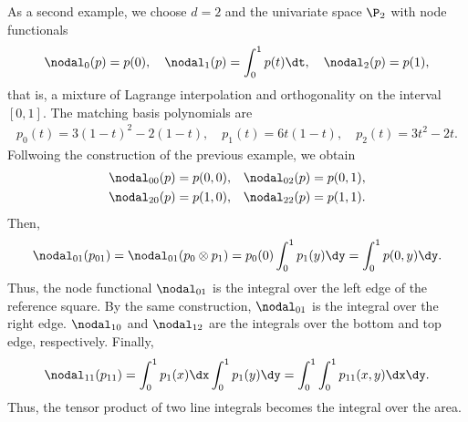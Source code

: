 

\begin{example}
  As a second example, we choose $d=2$ and the univariate space $\P_2$ with node functionals
  \begin{gather}
    \nodal_0(p) = p(0),
    \quad \nodal_1(p) = \int_0^1 p(t) \dt,
    \quad \nodal_2(p) = p(1),
  \end{gather}
  that is, a mixture of Lagrange interpolation and orthogonality on
  the interval $[0,1]$. The matching basis polynomials are
  \begin{gather}
    p_0(t) = 3(1-t)^2 - 2(1-t),
    \quad p_1(t) = 6 t(1-t),
    \quad p_2(t) = 3t^2-2t.
  \end{gather}
  Follwoing the construction of the previous example, we obtain
  \begin{gather}
    \begin{aligned}
    \nodal_{00}(p) &= p(0,0),
    &\nodal_{02}(p) &= p(0,1),\\
    \nodal_{20}(p) &= p(1,0),
    &\nodal_{22}(p) &= p(1,1).
    \end{aligned}
  \end{gather}
  Then,
  \begin{gather}
    \nodal_{01}(p_{01}) = \nodal_{01}(p_0\otimes p_1)
    = p_0(0)\int_0^1 p_1(y)\dy
    = \int_0^1 p(0,y) \dy.
  \end{gather}
  Thus, the node functional $\nodal_{01}$ is the integral over the
  left edge of the reference square. By the same construction,
  $\nodal_{01}$ is the integral over the right edge. $\nodal_{10}$ and
  $\nodal_{12}$ are the integrals over the bottom and top edge,
  respectively. Finally,
  \begin{gather}
    \nodal_{11}(p_{11})
    = \int_0^1 p_1(x)\dx \int_0^1 p_1(y) \dy
    = \int_0^1\int_0^1 p_{11}(x,y) \dx\dy.
  \end{gather}
  Thus, the tensor product of two line integrals becomes the integral
  over the area.
\end{example}

